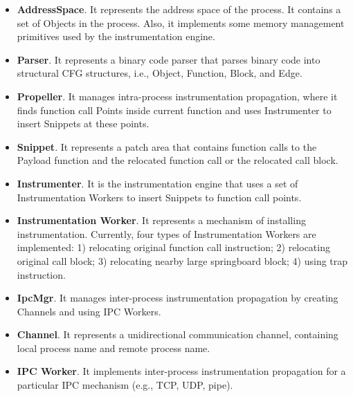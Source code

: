 \begin{itemize}
\item \textbf{AddressSpace}. It represents the address space of the process. It
  contains a set of Objects in the process. Also, it implements some memory
  management primitives used by the instrumentation engine.
\item \textbf{Parser}. It represents a binary code parser that parses binary
  code into structural CFG structures, i.e., Object, Function, Block, and Edge.
\item \textbf{Propeller}. It manages intra-process instrumentation propagation,
  where it finds function call Points inside current function and uses
  Instrumenter to insert Snippets at these points.
\item \textbf{Snippet}. It represents a patch area that contains function calls
  to the Payload function and the relocated function call or the relocated call
  block.
\item \textbf{Instrumenter}. It is the instrumentation engine that uses a set of
  Instrumentation Workers to insert Snippets to function call points.
\item \textbf{Instrumentation Worker}. It represents a mechanism of installing
  instrumentation. Currently, four types of Instrumentation Workers are
  implemented: 1) relocating original function call instruction; 2) relocating
  original call block; 3) relocating nearby large springboard block; 4) using
  trap instruction.
\item \textbf{IpcMgr}. It manages inter-process instrumentation propagation by
  creating Channels and using IPC Workers.
\item \textbf{Channel}. It represents a unidirectional communication channel,
  containing local process name and remote process name.
\item \textbf{IPC Worker}. It implements inter-process instrumentation
  propagation for a particular IPC mechanism (e.g., TCP, UDP, pipe).
\end{itemize}